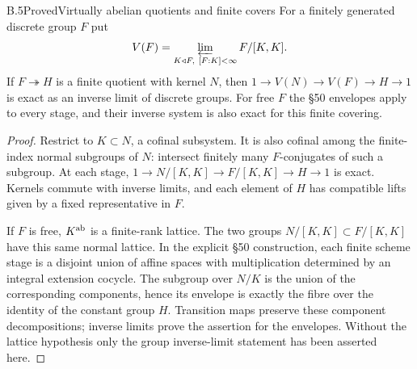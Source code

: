 \begin{statement}{B.5}{Proved}{Virtually abelian quotients and finite covers}
For a finitely generated discrete group $F$ put
\[
 V(F)=\varprojlim_{K\triangleleft F,\ [F:K]<\infty}F/[K,K].
\]
If $F\twoheadrightarrow H$ is a finite quotient with kernel $N$,
then $1\to V(N)\to V(F)\to H\to1$ is exact as an inverse limit
of discrete groups. For free $F$ the \S50 envelopes apply to
every stage, and their inverse system is also exact for this
finite covering.
\end{statement}
\begin{proof}
Restrict to $K\subset N$, a cofinal subsystem. It is also cofinal
among the finite-index normal subgroups of $N$: intersect finitely
many $F$-conjugates of such a subgroup. At each stage,
$1\to N/[K,K]\to F/[K,K]\to H\to1$ is exact. Kernels commute
with inverse limits, and each element of $H$ has compatible lifts
given by a fixed representative in $F$.

If $F$ is free, $K^{\mathrm{ab}}$ is a finite-rank lattice. The two groups
$N/[K,K]\subset F/[K,K]$ have this same normal lattice.
In the explicit \S50 construction, each finite scheme stage is
a disjoint union of affine spaces with multiplication determined
by an integral extension cocycle. The subgroup over $N/K$ is
the union of the corresponding components, hence its envelope
is exactly the fibre over the identity of the constant group
$H$. Transition maps preserve these component decompositions;
inverse limits prove the assertion for the envelopes. Without
the lattice hypothesis only the group inverse-limit statement
has been asserted here.
\end{proof}

